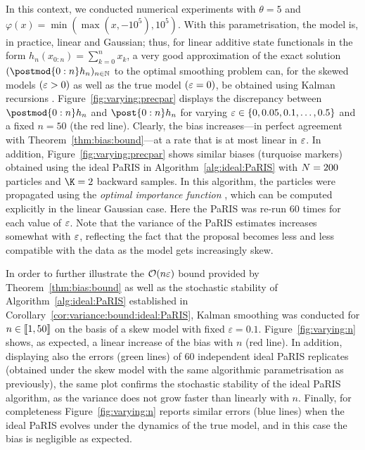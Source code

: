 In this context, we conducted numerical experiments with $\theta = 5$ and $\varphi(x) = \min(\max(x, -10^5), 10^5)$. With this parametrisation, the model is, in practice, linear and Gaussian; thus, for linear additive state functionals in the form $h_n(x_{0:n}) = \sum_{k = 0}^n x_k$, a very good approximation of the exact solution $(\postmod{0:n} h_n)_{n \in \nset}$ to the optimal smoothing problem can, for the skewed models $(\varepsilon > 0)$ as well as the true model $(\varepsilon = 0)$, be obtained using Kalman recursions \cite{rauch1965maximum}. Figure~\ref{fig:varying:precpar} displays the discrepancy between $\postmod{0:n} h_n$ and $\post{0:n} h_n$ for varying $\varepsilon \in \{0, 0.05, 0.1, \ldots, 0.5 \}$ and a fixed $n = 50$ (the red line). Clearly, the bias increases---in perfect agreement with Theorem~\ref{thm:bias:bound}---at a rate that is at most linear in $\varepsilon$. In addition, Figure~\ref{fig:varying:precpar} shows similar biases (turquoise markers) obtained using the ideal PaRIS in Algorithm~\ref{alg:ideal:PaRIS} with $N = 200$ particles and $\K = 2$ backward samples. In this algorithm, the particles were propagated using the \textit{optimal importance function} \cite{doucet2000sequential}, which can be computed explicitly in the linear Gaussian case. Here the PaRIS was re-run $60$ times for each value of $\varepsilon$. Note that the variance of the PaRIS estimates increases somewhat with $\varepsilon$, reflecting the fact that the proposal becomes less and less compatible with the data as the model gets increasingly skew. 

In order to further illustrate the $\mathcal{O}(n \varepsilon)$ bound provided by Theorem~\ref{thm:bias:bound} as well as the stochastic stability of Algorithm~\ref{alg:ideal:PaRIS} established in Corollary~\ref{cor:variance:bound:ideal:PaRIS}, Kalman smoothing was conducted for $n \in \llbracket 1, 50 \rrbracket$ on the basis of a skew model with fixed $\varepsilon = 0.1$. Figure~\ref{fig:varying:n} shows, as expected, a linear increase of the bias with $n$ (red line). In addition, displaying also the errors (green lines) of $60$ independent ideal PaRIS replicates (obtained under the skew model with the same algorithmic parametrisation as previously), the same plot confirms the stochastic stability of the ideal PaRIS algorithm, as the variance does not grow faster than linearly with $n$. Finally, for completeness Figure~\ref{fig:varying:n} reports similar errors (blue lines) when the ideal PaRIS evolves under the dynamics of the true model, and in this case the bias is negligible as expected.%

